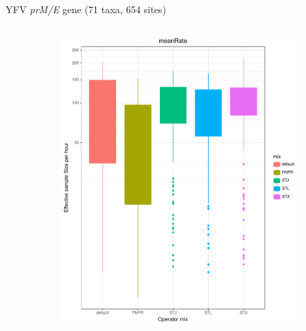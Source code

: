 \documentclass[newPxFont,numfooter,sectionpages]{beamer}
\begin{document}
\begin{frame}{YFV \textit{prM/E} gene (71 taxa, 654 sites)}
\begin{figure}
\begin{column}{0.5\textwidth}
\begin{figure}
     \includegraphics[width=\textwidth]{figures/ESS_hour_meanRate_YFV.pdf} \\
     \end{figure}
\end{column}
\end{figure}
\end{frame}
\end{document}
